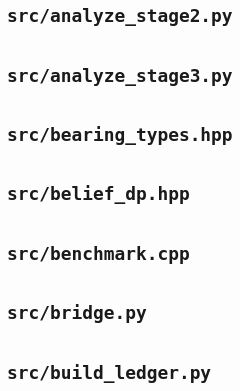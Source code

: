 \subsection*{\texttt{src/analyze\_stage2.py}}

\subsection*{\texttt{src/analyze\_stage3.py}}

\subsection*{\texttt{src/bearing\_types.hpp}}

\subsection*{\texttt{src/belief\_dp.hpp}}

\subsection*{\texttt{src/benchmark.cpp}}

\subsection*{\texttt{src/bridge.py}}

\subsection*{\texttt{src/build\_ledger.py}}

